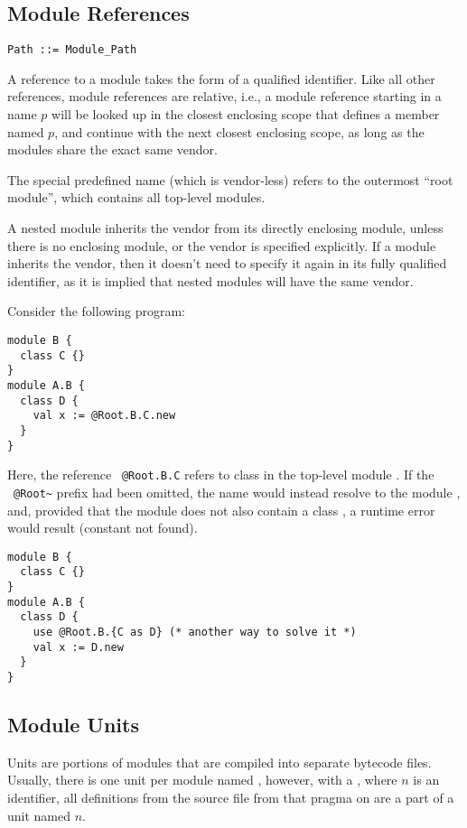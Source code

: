 \subsection{Module References}
\label{sec:module-refs}

\grammar\begin{lstlisting}
Path ::= Module_Path
\end{lstlisting}

A reference to a module takes the form of a qualified identifier. Like all other references, module references are relative, i.e., a module reference starting in a name $p$ will be looked up in the closest enclosing scope that defines a member named $p$, and continue with the next closest enclosing scope, as long as the modules share the exact same vendor. 

The special predefined name  (which is vendor-less) refers to the outermost ``root module'', which contains all top-level modules. 

A nested module inherits the vendor from its directly enclosing module, unless there is no enclosing module, or the vendor is specified explicitly. If a module inherits the vendor, then it doesn't need to specify it again in its fully qualified identifier, as it is implied that nested modules will have the same vendor. 

\example Consider the following program:
\begin{lstlisting}
module B {
  class C {}
}
module A.B {
  class D {
    val x := @Root.B.C.new
  }
}
\end{lstlisting}
Here, the reference ~\lstinline!@Root.B.C! refers to class  in the top-level module . If the ~\lstinline!@Root~! prefix had been omitted, the name  would instead resolve to the module , and, provided that the module does not also contain a class , a runtime error would result (constant not found). 
\begin{lstlisting}
module B {
  class C {}
}
module A.B {
  class D {
    use @Root.B.{C as D} (* another way to solve it *)
    val x := D.new
  }
}
\end{lstlisting}





\subsection{Module Units}
\label{sec:module-units}

Units are portions of modules that are compiled into separate bytecode files. Usually, there is one unit per module named , however, with a , where $n$ is an identifier, all definitions from the source file from that pragma on are a part of a unit named $n$. 

